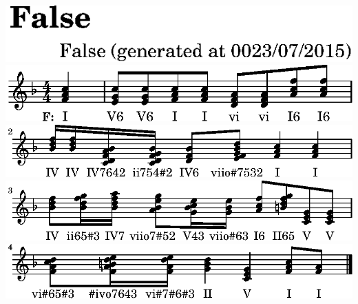 \includegraphics{../analysis/bwv1/aa/lily-baff07b9-1}%
\ifx\betweenLilyPondSystem \undefined
  \linebreak
\else
  \expandafter{}%
\fi
\includegraphics{../analysis/bwv1/aa/lily-baff07b9-2}%
\ifx\betweenLilyPondSystem \undefined
  \linebreak
\else
  \expandafter{}%
\fi
\includegraphics{../analysis/bwv1/aa/lily-baff07b9-3}%
\ifx\betweenLilyPondSystem \undefined
  \linebreak
\else
  \expandafter{}%
\fi
\includegraphics{../analysis/bwv1/aa/lily-baff07b9-4}%
\ifx\betweenLilyPondSystem \undefined
  \linebreak
\else
  \expandafter{}%
\fi
\includegraphics{../analysis/bwv1/aa/lily-baff07b9-5}%
